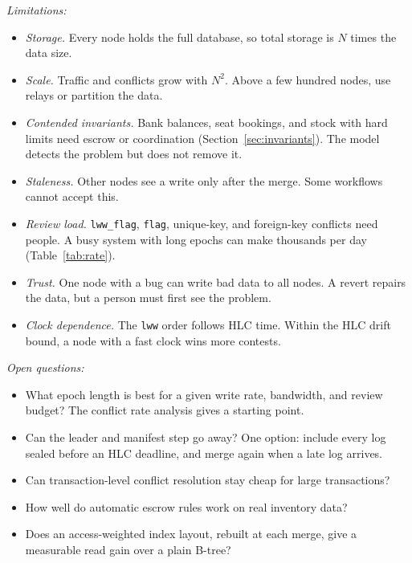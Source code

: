\documentclass[journal]{IEEEtran}
\newcommand{\code}[1]{\texttt{#1}}
\begin{document}
\emph{Limitations:}
\begin{itemize}
\item \emph{Storage.} Every node holds the full database, so total storage is $N$ times the data size.
\item \emph{Scale.} Traffic and conflicts grow with $N^2$. Above a few hundred nodes, use relays or partition the data.
\item \emph{Contended invariants.} Bank balances, seat bookings, and stock with hard limits need escrow or coordination (Section~\ref{sec:invariants}). The model detects the problem but does not remove it.
\item \emph{Staleness.} Other nodes see a write only after the merge. Some workflows cannot accept this.
\item \emph{Review load.} \code{lww\_flag}, \code{flag}, unique-key, and foreign-key conflicts need people. A busy system with long epochs can make thousands per day (Table~\ref{tab:rate}).
\item \emph{Trust.} One node with a bug can write bad data to all nodes. A revert repairs the data, but a person must first see the problem.
\item \emph{Clock dependence.} The \code{lww} order follows HLC time. Within the HLC drift bound, a node with a fast clock wins more contests.
\end{itemize}

\emph{Open questions:}
\begin{itemize}
\item What epoch length is best for a given write rate, bandwidth, and review budget? The conflict rate analysis gives a starting point.
\item Can the leader and manifest step go away? One option: include every log sealed before an HLC deadline, and merge again when a late log arrives.
\item Can transaction-level conflict resolution stay cheap for large transactions?
\item How well do automatic escrow rules work on real inventory data?
\item Does an access-weighted index layout, rebuilt at each merge, give a measurable read gain over a plain B-tree?
\end{itemize}
\end{document}
